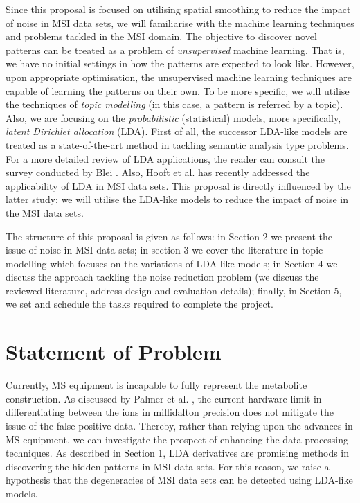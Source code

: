 \documentclass{mprop}
\begin{document}
\par Since this proposal is focused on utilising spatial smoothing to reduce the impact of noise in MSI data sets, we will familiarise with the machine learning techniques and problems tackled in the MSI domain. The objective to discover novel patterns can be treated as a problem of \textit{unsupervised} machine learning. That is, we have no initial settings in how the patterns are expected to look like. However, upon appropriate optimisation, the unsupervised machine learning techniques are capable of learning the patterns on their own. To be more specific, we will utilise the techniques of \textit{topic modelling} (in this case, a pattern is referred by a topic). Also, we are focusing on the \textit{probabilistic} (statistical) models, more specifically, \textit{latent Dirichlet allocation} (LDA). First of all, the successor LDA-like models are treated as a state-of-the-art method in tackling semantic analysis type problems. For a more detailed review of LDA applications, the reader can consult the survey conducted by Blei \cite{blei_2012}. Also, Hooft et al. \cite{hooft} has recently addressed the applicability of LDA in MSI data sets. This proposal is directly influenced by the latter study: we will utilise the LDA-like models to reduce the impact of noise in the MSI data sets.  

\par The structure of this proposal is given as follows: in Section 2 we present the issue of noise in MSI data sets; in section 3 we cover the literature in topic modelling which focuses on the variations of LDA-like models; in Section 4 we discuss the approach tackling the noise reduction problem (we discuss the reviewed literature, address design and evaluation details); finally, in Section 5, we set and schedule the tasks required to complete the project.

\section{Statement of Problem}

\par Currently, MS equipment is incapable to fully represent the metabolite construction. As discussed by Palmer et al. \cite{palmer},  the current hardware limit in differentiating between the ions in millidalton precision does not mitigate the issue of the false positive data. Thereby, rather than relying upon the advances in MS equipment, we can investigate the prospect of enhancing the data processing techniques. As described in Section 1, LDA derivatives are promising methods in discovering the hidden patterns in MSI data sets. For this reason, we raise a hypothesis that the degeneracies of MSI data sets can be detected using LDA-like models.   
\end{document}

